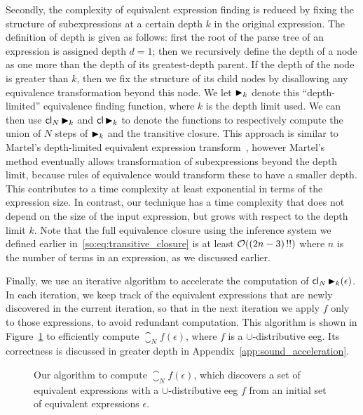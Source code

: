 Secondly, the complexity of equivalent expression finding is reduced by
fixing the structure of subexpressions at a certain depth $k$ in the original
expression.  The definition of depth is given as follows: first the root of
the parse tree of an expression is assigned depth $d = 1$; then we recursively
define the depth of a node as one more than the depth of its greatest-depth
parent.  If the depth of the node is greater than $k$, then we fix the
structure of its child nodes by disallowing any equivalence transformation
beyond this node. We let $\operatorname{\blacktriangleright}_k$ denote this ``depth-limited'' equivalence
finding function, where $k$ is the depth limit used.  We can then use
$\operatorname{\mathsf{cl}}_N \operatorname{\blacktriangleright}_k$ and $\operatorname{\mathsf{cl}} \operatorname{\blacktriangleright}_k$ to denote the functions to
respectively compute the union of $N$ steps of $\operatorname{\blacktriangleright}_k$ and the transitive
closure. This approach is similar to Martel's depth-limited equivalent
expression transform~\cite{martel07}, however Martel's method eventually allows
transformation of subexpressions beyond the depth limit, because rules of
equivalence would transform these to have a smaller depth.  This contributes
to a time complexity at least exponential in terms of the expression size. In
contrast, our technique has a time complexity that does not depend on the size
of the input expression, but grows with respect to the depth limit $k$. Note
that the full equivalence closure using the inference system we defined earlier
in~\eqref{so:eq:transitive_closure} is at least $\operatorname{\mathcal{O}}((2n - 3)\,!!)$ where $n$
is the number of terms in an expression, as we discussed earlier.

Finally, we use an iterative algorithm to accelerate the computation of
$\operatorname{\mathsf{cl}}_N \operatorname{\blacktriangleright}_k (\epsilon)$.  In each iteration, we keep track
of the equivalent expressions that are newly discovered in the current
iteration, so that in the next iteration we apply $f$ only to those
expressions, to avoid redundant computation.  This algorithm is shown in
Figure~\ref{so:alg:closure} to efficiently compute $\closure_N f(\epsilon)$,
where $f$ is a $\cup$-distributive \gls{eeg}\@.  Its correctness is discussed
in greater depth in Appendix~\ref{app:sound_acceleration}.
\begin{figure}[ht]
    \centering
    \begin{algorithmic}
                \EndIf{}
            \EndFor{}
        \EndFunction{}
    \end{algorithmic}
    \caption{%
        Our algorithm to compute $\closure_N f (\epsilon)$, which discovers a
        set of equivalent expressions with a $\cup$-distributive \gls{eeg} $f$
        from an initial set of equivalent expressions $\epsilon$.
    }\label{so:alg:closure}
\end{figure}



